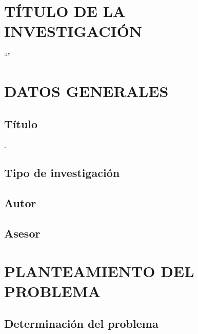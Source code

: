 \documentclass[12pt,a4paper]{article}
\begin{document}
\flushbottom





\section{TÍTULO DE LA INVESTIGACIÓN}
``\titulo''
\section{DATOS GENERALES}
\subsection{Título} \titulo.
\subsection{Tipo de investigación} \tipo
\subsection{Autor} \autor
\subsection{Asesor} \asesor

\section{PLANTEAMIENTO DEL PROBLEMA}
\subsection{Determinación del problema}
\end{document}
